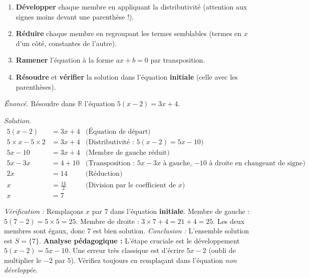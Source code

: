 \documentclass[11pt]{article}
\begin{document}
\begin{methode}
\leavevmode
\begin{enumerate}
    \item \textbf{Développer} chaque membre en appliquant la distributivité (attention aux signes \og moins \fg{} devant une parenthèse !).
    \item \textbf{Réduire} chaque membre en regroupant les termes semblables (termes en $x$ d'un côté, constantes de l'autre).
    \item \textbf{Ramener} l'équation à la forme $ax + b = 0$ par transposition.
    \item \textbf{Résoudre} et \textbf{vérifier} la solution dans l'équation \textbf{initiale} (celle avec les parenthèses).
\end{enumerate}
\end{methode}

\begin{exoresolu}[Équation avec parenthèses : $5(x - 2) = 3x + 4$]
\emph{Énoncé.} Résoudre dans $\mathbb{R}$ l'équation $5(x - 2) = 3x + 4$.

\emph{Solution.}
\begin{align*}
    5(x - 2) &= 3x + 4 & \text{(Équation de départ)} \\
    5 \times x - 5 \times 2 &= 3x + 4 & \text{(Distributivité : $5(x-2)=5x-10$)} \\
    5x - 10 &= 3x + 4 & \text{(Membre de gauche réduit)} \\
    5x - 3x &= 4 + 10 & \text{(Transposition : $5x-3x$ à gauche, $-10$ à droite en changeant de signe)} \\
    2x &= 14 & \text{(Réduction)} \\
    x &= \frac{14}{2} & \text{(Division par le coefficient de $x$)} \\
    x &= 7
\end{align*}

\emph{Vérification :} Remplaçons $x$ par $7$ dans l'équation \textbf{initiale}.
Membre de gauche : $5(7 - 2) = 5 \times 5 = 25$.
Membre de droite : $3 \times 7 + 4 = 21 + 4 = 25$.
Les deux membres sont égaux, donc $7$ est bien solution.
\emph{Conclusion :} L'ensemble solution est $S = \{7\}$.
\tcblower
\textbf{Analyse pédagogique :} L'étape cruciale est le développement $5(x-2) = 5x - 10$. Une erreur très classique est d'écrire $5x - 2$ (oubli de multiplier le $-2$ par $5$). Vérifiez toujours en remplaçant dans l'équation \emph{non développée}.
\end{exoresolu}
\end{document}
